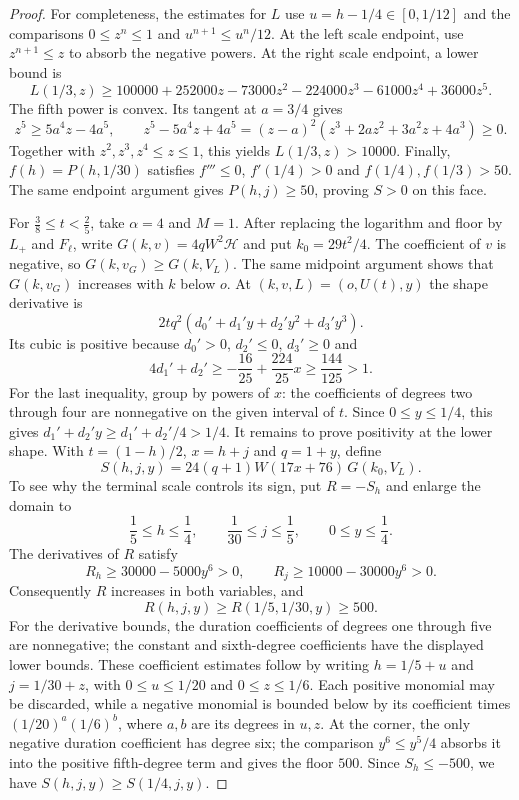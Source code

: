\begin{proof}
For completeness, the estimates for $L$ use $u=h-1/4\in[0,1/12]$ and the comparisons
$0\le z^n\le1$ and $u^{n+1}\le u^n/12$.
At the left scale endpoint, use $z^{n+1}\le z$ to absorb the negative powers.
At the right scale endpoint, a lower bound is
\[
 L(1/3,z)\ge100000+252000z-73000z^2-224000z^3-61000z^4+36000z^5.
\]
The fifth power is convex. Its tangent at $a=3/4$ gives
\[
 z^5\ge5a^4z-4a^5,
 \qquad
 z^5-5a^4z+4a^5=(z-a)^2(z^3+2az^2+3a^2z+4a^3)\ge0.
\]
Together with $z^2,z^3,z^4\le z\le1$, this yields $L(1/3,z)>10000$.
Finally, $f(h)=P(h,1/30)$ satisfies $f'''\le0$, $f'(1/4)>0$ and
$f(1/4),f(1/3)>50$. The same endpoint argument gives $P(h,j)\ge50$, proving $S>0$ on this face.

For $\frac38\le t<\frac25$, take $\alpha=4$ and $M=1$.
After replacing the logarithm and floor by $L_+$ and $F_\ell$, write
$G(k,v)=4qW^2\mathcal H$ and put $k_0=29t^2/4$.
The coefficient of $v$ is negative, so $G(k,v_G)\ge G(k,V_L)$.
The same midpoint argument shows that $G(k,v_G)$ increases with $k$ below $o$.
At $(k,v,L)=(o,U(t),y)$ the shape derivative is
\[
 2tq^2(d_0'+d_1'y+d_2'y^2+d_3'y^3).
\]
Its cubic is positive because $d_0'>0$, $d_2'\le0$, $d_3'\ge0$ and
\[
 4d_1'+d_2'\ge-\frac{16}{25}+\frac{224}{25}x
             \ge\frac{144}{125}>1.
\]
For the last inequality, group by powers of $x$: the coefficients of degrees two through four
are nonnegative on the given interval of $t$.
Since $0\le y\le1/4$, this gives $d_1'+d_2'y\ge d_1'+d_2'/4>1/4$.
It remains to prove positivity at the lower shape. With $t=(1-h)/2$, $x=h+j$ and $q=1+y$, define
\[
 S(h,j,y)=24(q+1)W(17x+76)\,G(k_0,V_L).
\]
To see why the terminal scale controls its sign, put $R=-S_h$ and enlarge the domain to
\[
 \frac15\le h\le\frac14,\qquad \frac1{30}\le j\le\frac15,
 \qquad 0\le y\le\frac14.
\]
The derivatives of $R$ satisfy
\[
 R_h\ge30000-5000y^6>0,\qquad R_j\ge10000-30000y^6>0.
\]
Consequently $R$ increases in both variables, and
\[
 R(h,j,y)\ge R(1/5,1/30,y)\ge500.
\]
For the derivative bounds, the duration coefficients of degrees one through five are nonnegative;
the constant and sixth-degree coefficients have the displayed lower bounds.
These coefficient estimates follow by writing $h=1/5+u$ and $j=1/30+z$, with
$0\le u\le1/20$ and $0\le z\le1/6$.
Each positive monomial may be discarded, while a negative monomial is bounded below by
its coefficient times $(1/20)^a(1/6)^b$, where $a,b$ are its degrees in $u,z$.
At the corner, the only negative duration coefficient has degree six; the comparison
$y^6\le y^5/4$ absorbs it into the positive fifth-degree term and gives the floor $500$.
Since $S_h\le-500$, we have $S(h,j,y)\ge S(1/4,j,y)$.


\end{proof}
